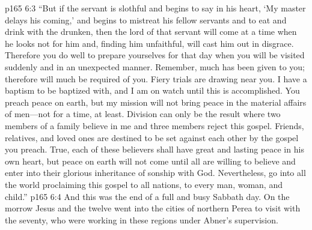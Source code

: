 \vs p165 6:3 \textcolor{ubdarkred}{“But if the servant is slothful and begins to say in his heart, ‘My master delays his coming,’ and begins to mistreat his fellow servants and to eat and drink with the drunken, then the lord of that servant will come at a time when he looks not for him and, finding him unfaithful, will cast him out in disgrace. Therefore you do well to prepare yourselves for that day when you will be visited suddenly and in an unexpected manner. Remember, much has been given to you; therefore will much be required of you. Fiery trials are drawing near you. I have a baptism to be baptized with, and I am on watch until this is accomplished. You preach peace on earth, but my mission will not bring peace in the material affairs of men---not for a time, at least. Division can only be the result where two members of a family believe in me and three members reject this gospel. Friends, relatives, and loved ones are destined to be set against each other by the gospel you preach. True, each of these believers shall have great and lasting peace in his own heart, but peace on earth will not come until all are willing to believe and enter into their glorious inheritance of sonship with God. Nevertheless, go into all the world proclaiming this gospel to all nations, to every man, woman, and child.”}
\pc \vs p165 6:4 And this was the end of a full and busy Sabbath day. On the morrow Jesus and the twelve went into the cities of northern Perea to visit with the seventy, who were working in these regions under Abner’s supervision.
